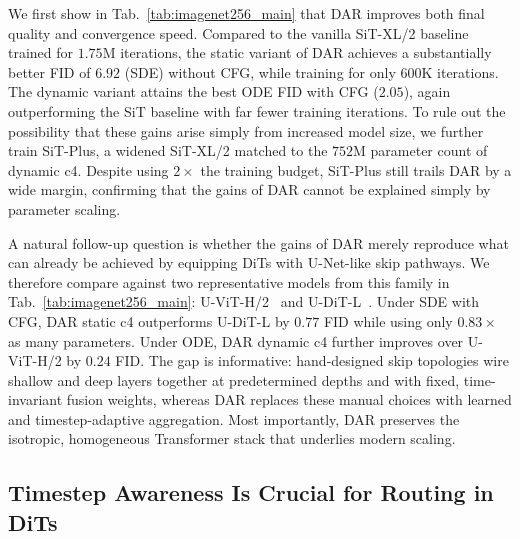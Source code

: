 \documentclass{llmxive}
\begin{document}
We first show in Tab.~\ref{tab:imagenet256_main} that \textsc{DAR} improves both final quality and convergence speed. Compared to the vanilla SiT-XL/2 baseline trained for $1.75\text{M}$ iterations, the static variant of \textsc{DAR} achieves a substantially better FID of $6.92$ (SDE) without CFG, while training for only $600\text{K}$ iterations. The dynamic variant attains the best ODE FID with CFG ($2.05$), again outperforming the SiT baseline with far fewer training iterations. To rule out the possibility that these gains arise simply from increased model size, we further train SiT-Plus, a widened SiT-XL/2 matched to the $752$M parameter count of dynamic c4. Despite using $2\times$ the training budget, SiT-Plus still trails \textsc{DAR} by a wide margin, confirming that the gains of \textsc{DAR} cannot be explained simply by parameter scaling.

A natural follow-up question is whether the gains of \textsc{DAR} merely reproduce what can already be achieved by equipping DiTs with U-Net-like skip pathways. We therefore compare against two representative models from this family in Tab.~\ref{tab:imagenet256_main}: U-ViT-H/2~\citep{bao2023all} and U-DiT-L~\citep{tian2024u}. Under SDE with CFG, \textsc{DAR} static c4 outperforms U-DiT-L by $0.77$ FID while using only $0.83\times$ as many parameters. Under ODE, \textsc{DAR} dynamic c4 further improves over U-ViT-H/2 by $0.24$ FID. The gap is informative: hand-designed skip topologies wire shallow and deep layers together at predetermined depths and with fixed, time-invariant fusion weights, whereas \textsc{DAR} replaces these manual choices with learned and timestep-adaptive aggregation. Most importantly, \textsc{DAR} preserves the isotropic, homogeneous Transformer stack that underlies modern scaling.


\subsection{Timestep Awareness Is Crucial for Routing in DiTs}
\label{sec:time}
\end{document}
